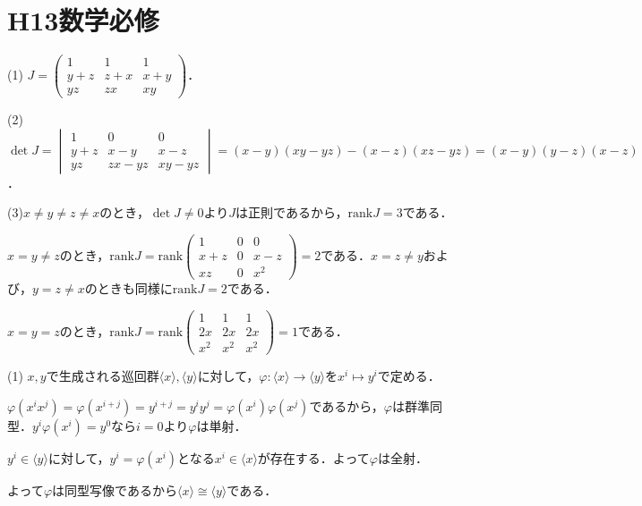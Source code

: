 \documentclass[
		book,
		head_space=20mm,
		foot_space=20mm,
		gutter=10mm,
		line_length=190mm
]{jlreq}
\begin{document}
\section{H13数学必修}
(1) $J = \begin{pmatrix}
    1 & 1 & 1 \\
    y+z & z+x & x+y \\
    yz & zx & xy
    \end{pmatrix}$．

(2)
$\det J = \begin{vmatrix}
    1 & 0 & 0 \\
    y+z & x-y & x-z \\
    yz & zx-yz & xy-yz 
\end{vmatrix} = (x-y)(xy-yz) - (x-z)(xz-yz) = (x-y)(y-z)(x-z)$．

(3)$x\neq y \neq z \neq x$のとき，$\det J \neq 0$より$J$は正則であるから，$ \mathrm{rank} J = 3$である．

$x=y\neq z$のとき，$\mathrm{rank} J = \mathrm{rank} \begin{pmatrix}
    1 & 0 & 0 \\
    x+z & 0 & x-z \\
    xz & 0 & x^2
\end{pmatrix} = 2$である．$x=z\neq y$および，$y=z\neq x$のときも同様に$\mathrm{rank} J = 2$である．

$x=y=z$のとき，$\mathrm{rank} J = \mathrm{rank} \begin{pmatrix}
    1 & 1 & 1 \\
    2x & 2x & 2x \\
    x^2 & x^2 & x^2
\end{pmatrix} = 1$である．

(1) $x,y$で生成される巡回群$\langle x \rangle , \langle y \rangle $に対して，$\varphi\colon \langle x \rangle \rightarrow \langle y \rangle$を$x^i \mapsto y^i$で定める．

$\varphi(x^i x^j)=\varphi(x^{i+j})=y^{i+j}=y^i y^j=\varphi(x^i)\varphi(x^j)$であるから，$\varphi$は群準同型．$y^i\varphi(x^i)=y^0$なら$i=0$より$\varphi$は単射．

$y^i\in \langle y \rangle$に対して，$y^i=\varphi(x^i)$となる$x^i\in \langle x \rangle$が存在する．よって$\varphi$は全射．

よって$\varphi$は同型写像であるから$\langle x \rangle \cong \langle y \rangle$である．
\end{document}
